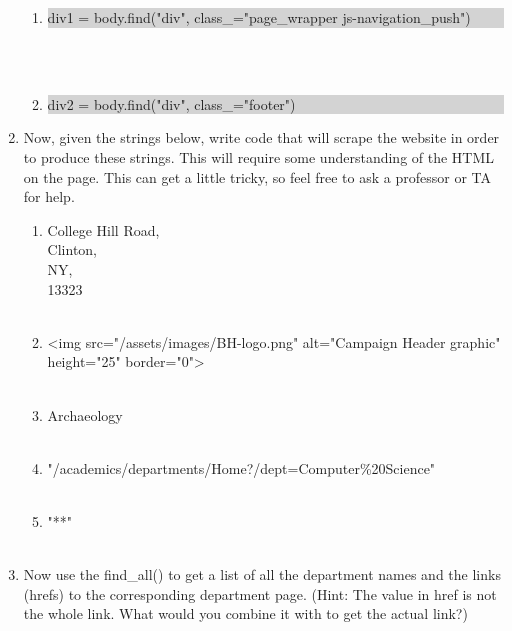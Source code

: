 \documentclass[11pt, letterpaper, onecolumn, oneside, final]{article}
\begin{document}
\begin{enumerate}
\begin{enumerate}
        \item \colorbox{lightgray}{\parbox{.83\textwidth}{\consolas div1 = body.find("div", class\_="page\_wrapper js-navigation\_push")}} \\\\ 
        
        \item \colorbox{lightgray}{\parbox{.51\textwidth}{\consolas div2 = body.find("div", class\_="footer")}}
        
    \end{enumerate}
    
    \item Now, given the strings below, write code that will scrape the website in order to produce these strings. This will require some understanding of the HTML on the page. This can get a little tricky, so feel free to ask a professor or TA for help.
    \begin{enumerate}
        \item { College Hill Road, \\Clinton, \\NY, \\13323}\\\\ %
        \item {\consolas <img src="/assets/images/BH-logo.png" alt="Campaign Header graphic" height="25" border="0">}\\\\
        \item {\consolas Archaeology}\\\\
        \item {\consolas "/academics/departments/Home?/dept=Computer\%20Science"}\\\\
        \item {\consolas "**"}\\\\
    \end{enumerate}
    
    \item Now use the {\consolas find\_all()} to get a list of all the department names and the links ({\consolas hrefs}) to the corresponding department page. (Hint: The value in {\consolas href} is not the whole link. What would you combine it with to get the actual link?)
    

\end{enumerate}
\end{document}

